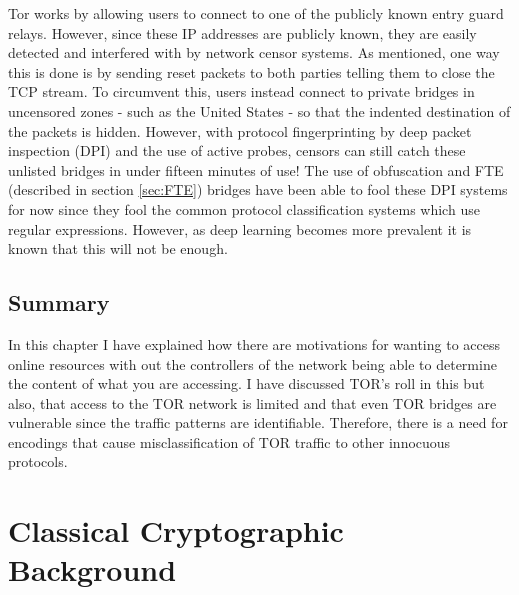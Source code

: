 \documentclass[ %
                    author={Samuel Russell},
                supervisor={Prof. Bogdan Warinschi},
                    degree={MEng},
                     title={Innocuous Ciphertexts},
                  subtitle={The DE-CENSOR Scheme},
                      type={research},
                      year={2018} ]{dissertation}
\begin{document}
Tor works by allowing users to connect to one of the publicly known entry guard relays. However, since these IP addresses are publicly known, they are easily detected and interfered with by network censor systems. As mentioned, one way this is done is by sending reset packets to both parties telling them to close the TCP stream.
To circumvent this, users instead connect to private bridges in uncensored zones - such as the United States - so that the indented destination of the packets is hidden. However, with protocol fingerprinting by deep packet inspection (DPI) and the use of active probes, censors can still catch these unlisted bridges in under fifteen minutes of use!
The use of obfuscation and FTE (described in section \ref{sec:FTE}) bridges have been able to fool these DPI systems for now since they fool the common protocol classification systems which use regular expressions. However, as deep learning becomes more prevalent it is known that this will not be enough.

\section{Summary}

In this chapter I have explained how there are motivations for wanting to access online resources  with out the controllers of the network being able to determine the content of what you are accessing. I have discussed TOR's roll in this but also, that access to the TOR network is limited and that even TOR bridges are vulnerable since the traffic patterns are identifiable. Therefore, there is a need for encodings that cause misclassification of TOR traffic to other innocuous protocols. 


\chapter{Classical Cryptographic Background}
\label{chap:technical}
\end{document}
